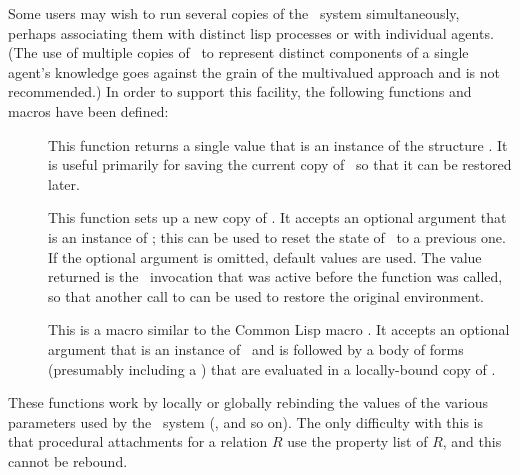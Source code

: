 Some users may wish to run several copies of the \mvl\ system
simultaneously, perhaps associating them with distinct {\sc lisp}
processes or with individual agents.  (The use of multiple copies of
\mvl\ to represent distinct components of a single agent's knowledge
goes against the grain of the multivalued approach and is not
recommended.)  In order to support this facility, the following
functions and macros have been defined:
 \begin{description}
 \item [] This function returns a
single value that is an instance of the structure \mi.  It is useful
primarily for saving the current copy of \mvl\ so that it can be
restored later.
 \item [] This function sets up a new
copy of \mvl.  It accepts an optional argument that is an instance of
\mi; this can be used to reset the state of \mvl\ to a previous one.
If the optional argument is omitted, default values are used.  The
value returned is the \mvl\ invocation that was active before the
function was called, so that another call to
 can be used to restore the original
environment.
 \item [] This is a macro similar to the
Common Lisp macro .  It accepts an optional
argument that is an instance of \mi\ and is followed by a body of
forms (presumably including a ) that are evaluated
in a locally-bound copy of \mvl.
 \end{description}

These functions work by locally or globally rebinding the values of
the various parameters used by the \mvl\ system
(,  and so on).  The only
difficulty with this is that procedural attachments for a relation
$R$ use the property list of $R$, and this cannot be rebound.

